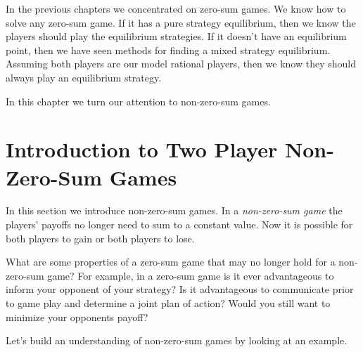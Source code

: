 In the previous chapters we concentrated on zero-sum games. We know how to solve any zero-sum game. If it has a pure strategy equilibrium, then we know the players should play the equilibrium strategies. If it doesn't have an equilibrium point, then we have seen methods for finding a mixed strategy equilibrium. Assuming both players are our model rational players, then we know they should always play an equilibrium strategy.

In this chapter we turn our attention to non-zero-sum games.

\section{Introduction to Two Player Non-Zero-Sum Games}\label{Intrononzero}




In this section we introduce non-zero-sum games. In a \emph{non-zero-sum game} the players' payoffs no longer need to sum to a constant value. Now it is possible for both players to gain or both players to lose.


\begin{xca}\label{E:propertiesnonzero}
What are some properties of a zero-sum game that may no longer hold for a non-zero-sum game? For example, in a zero-sum game is it ever advantageous to inform your opponent of your strategy? Is it advantageous to communicate prior to game play and determine a joint plan  of action? Would you still want to minimize your opponents payoff?
\end{xca}

Let's build an understanding of non-zero-sum games by looking at an example.

